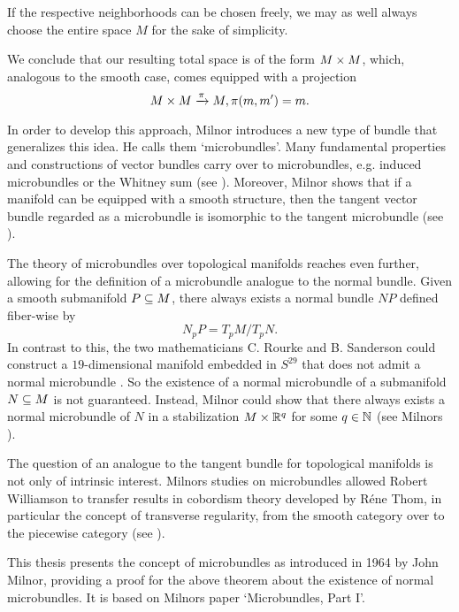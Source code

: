 \begin{myparagraph}
If the respective neighborhoods can be chosen freely, we may as well always choose the entire space $M$ for the sake of simplicity.

We conclude that our resulting total space is of the form $M \times M$, which, analogous to the smooth case, comes equipped with a projection \[ M \times M \xrightarrow{\pi} M, \pi(m, m') = m. \]

In order to develop this approach, Milnor introduces a new type of bundle that generalizes this idea. He calls them `microbundles'. Many fundamental properties and constructions of vector bundles carry over to microbundles, e.g. induced microbundles or the Whitney sum (see ). Moreover, Milnor shows that if a manifold can be equipped with a smooth structure, then the tangent vector bundle regarded as a microbundle is isomorphic to the tangent microbundle (see ).

The theory of microbundles over topological manifolds reaches even further, allowing for the definition of a microbundle analogue to the normal bundle. Given a smooth submanifold $P \subseteq{} M$, there always exists a normal bundle $NP$ defined fiber-wise by \[ N_p P = T_p M / T_p N. \] In contrast to this, the two mathematicians C. Rourke and B. Sanderson could construct a $19$-dimensional manifold embedded in $S^{29}$ that does not admit a normal microbundle \cite{rourke}. So the existence of a normal microbundle of a submanifold $N \subseteq{} M$ is not guaranteed. Instead, Milnor could show that there always exists a normal microbundle of $N$ in a stabilization $M \times \mathbb{R}^q$ for some $q \in \mathbb{N}$ (see Milnors ).

The question of an analogue to the tangent bundle for topological manifolds is not only of intrinsic interest. Milnors studies on microbundles allowed Robert Williamson to transfer results in cobordism theory developed by Réne Thom, in particular the concept of transverse regularity, from the smooth category over to the piecewise category (see \cite[§3]{williamson}).

This thesis presents the concept of microbundles as introduced in 1964 by John Milnor, providing a proof for the above theorem about the existence of normal microbundles. It is based on Milnors paper `Microbundles, Part I'. \end{myparagraph}